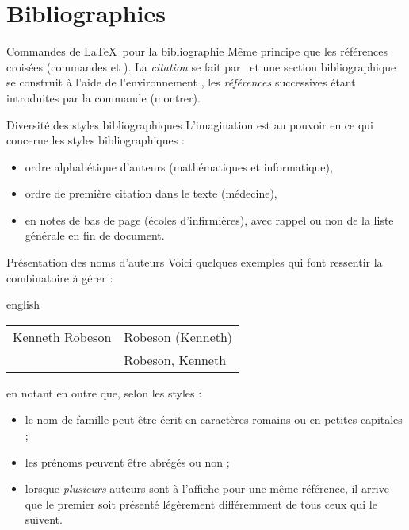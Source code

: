 \documentclass[pdf]{beamer}
\begin{document}
\section{Bibliographies}

\begin{frame}{Commandes de \LaTeX\ pour la bibliographie}
Même principe que les références croisées (commandes
\foreignlanguage{english}{} et
\foreignlanguage{english}{}). La \emph{citation} se fait par \og
{}\fg\ et une section bibliographique se construit à
l'aide de l'environnement
\foreignlanguage{english}{}, les \emph{références}
successives étant introduites par la commande
\foreignlanguage{english}{} (montrer).
\end{frame}

\begin{frame}{Diversité des styles bibliographiques}
L'imagination est au pouvoir en ce qui concerne les styles bibliographiques
:\pause
\begin{itemize}
 \item ordre alphabétique d'auteurs (mathématiques et informatique),\pause
 \item ordre de première citation dans le texte (médecine),\pause
 \item en notes de bas de page (écoles d'infirmières), avec rappel ou non de la
liste générale en fin de document.
\end{itemize}
\end{frame}

\begin{frame}{Présentation des noms d'auteurs}
Voici quelques exemples qui font ressentir la combinatoire à gérer :
\begin{otherlanguage*}{english}
\begin{center}
\begin{tabular}{l@{\qquad\qquad}l}
Kenneth Robeson & Robeson (Kenneth) \\
                & Robeson, Kenneth
\end{tabular}
\end{center}
\end{otherlanguage*}\pause
en notant en outre que, selon les styles :
\begin{itemize}
 \item le nom de famille peut être écrit en caractères romains ou en petites
capitales ;\pause
 \item les prénoms peuvent être abrégés ou non ;\pause
 \item lorsque \emph{plusieurs} auteurs sont à l'affiche pour une même
référence, il arrive que le premier soit présenté légèrement différemment de
tous ceux qui le suivent.
\end{itemize}
\end{frame}
\end{document}
